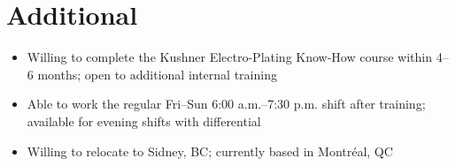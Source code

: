 \documentclass[letterpaper,11pt]{article}
\begin{document}
\section{Additional}
  \begin{itemize}
    \item Willing to complete the Kushner Electro-Plating Know-How course within 4--6 months; open to additional internal training
    \item Able to work the regular Fri--Sun 6:00 a.m.--7:30 p.m. shift after training; available for evening shifts with differential
    \item Willing to relocate to Sidney, BC; currently based in Montr\'eal, QC
  \end{itemize}

\vspace{-8pt}
\end{document}
